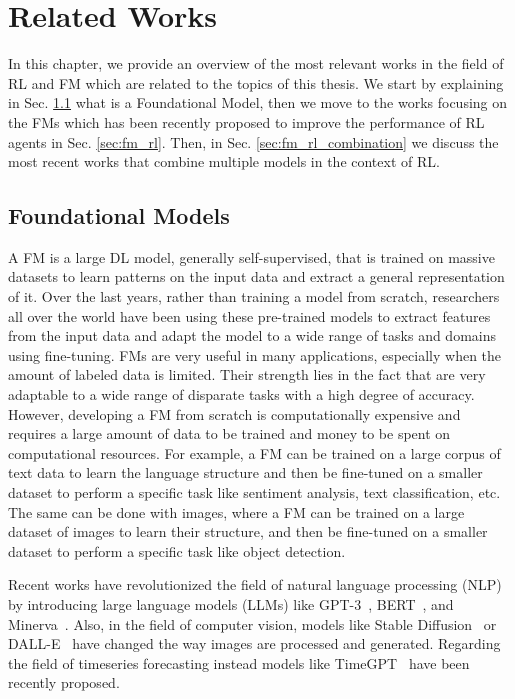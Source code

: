 
\chapter{Related Works}
\label{ch:related_work}
In this chapter, we provide an overview of the most relevant works in the field of RL and FM which are related to the topics of this thesis\@.
We start by explaining in Sec. \ref{sec:fm} what is a Foundational Model, then we move to the works focusing on the FMs which has been recently proposed to improve the performance of RL agents in Sec. \ref{sec:fm_rl}.
Then, in Sec. \ref{sec:fm_rl_combination} we discuss the most recent works that combine multiple models in the context of RL\@.

\section{Foundational Models}\label{sec:fm}
A FM is a large DL model, generally self-supervised, that is trained on massive datasets to learn patterns on the input data and extract a general representation of it.
Over the last years, rather than training a model from scratch, researchers all over the world have been using these pre-trained models to extract features from the input data and adapt the model to a wide range of tasks and domains using fine-tuning.
FMs are very useful in many applications, especially when the amount of labeled data is limited.
Their strength lies in the fact that are very adaptable to a wide range of disparate tasks with a high degree of accuracy.
However, developing a FM from scratch is computationally expensive and requires a large amount of data to be trained and money to be spent on computational resources.
For example, a FM can be trained on a large corpus of text data to learn the language structure and then be fine-tuned on a smaller dataset to perform a specific task like sentiment analysis, text classification, etc.
The same can be done with images, where a FM can be trained on a large dataset of images to learn their structure, and then be fine-tuned on a smaller dataset to perform a specific task like object detection.

Recent works have revolutionized the field of natural language processing (NLP) by introducing large language models (LLMs) like GPT-3~\citep{brown2020language}, BERT~\citep{devlin2018bert}, and Minerva~\citep{minerva}.
Also, in the field of computer vision, models like Stable Diffusion~\citep{rombach2022high} or DALL-E~\citep{ramesh2021zero} have changed the way images are processed and generated.
Regarding the field of timeseries forecasting instead models like TimeGPT~\citep{liao2024timegpt} have been recently proposed.



